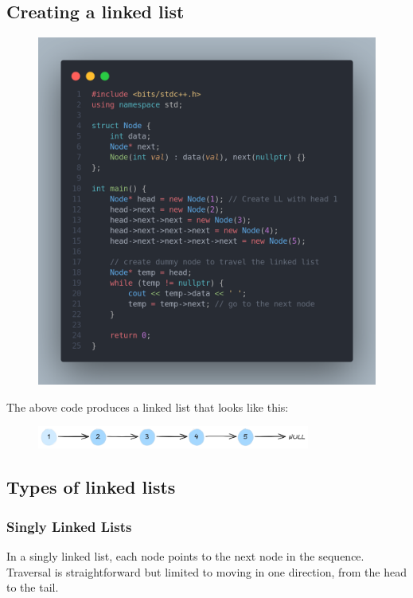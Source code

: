 \documentclass[a4paper, 12pt]{book}
\begin{document}
	\subsection{Creating a linked list}
	\begin{figure}[H]
		\centering
		\includegraphics[width=\textwidth]{CreateLL.png}
		\label{fig:CreateLL}
	\end{figure}
	
	The above code produces a linked list that looks like this:
	
	\begin{figure}[h]
		\vspace{2mm}
		\centering
		\includegraphics[width=0.8\textwidth]{1to5ll.png}
		\label{fig:1to5ll}
	\end{figure}
	
	\subsection{Types of linked lists}
	\subsubsection{Singly Linked Lists}
	In a singly linked list, each node points to the next node in the sequence. Traversal is straightforward but limited to moving in one direction, from the head to the tail.
	
\end{document}
